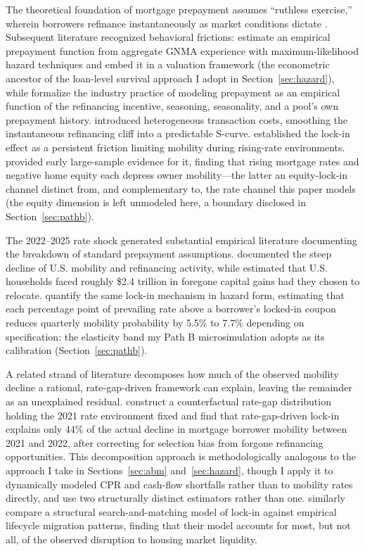 \documentclass[12pt]{article}
\begin{document}
The theoretical foundation of mortgage prepayment assumes ``ruthless exercise,'' wherein borrowers refinance instantaneously as market conditions dictate \citep{dunn1981}. Subsequent literature recognized behavioral frictions: \citet{schwartz1989} estimate an empirical prepayment function from aggregate GNMA experience with maximum-likelihood hazard techniques and embed it in a valuation framework (the econometric ancestor of the loan-level survival approach I adopt in Section~\ref{sec:hazard}), while \citet{richard1989} formalize the industry practice of modeling prepayment as an empirical function of the refinancing incentive, seasoning, seasonality, and a pool's own prepayment history. \citet{stanton1995} introduced heterogeneous transaction costs, smoothing the instantaneous refinancing cliff into a predictable S-curve. \citet{quigley1987,quigley2002} established the lock-in effect as a persistent friction limiting mobility during rising-rate environments. \citet{ferreira2010} provided early large-sample evidence for it, finding that rising mortgage rates and negative home equity each depress owner mobility---the latter an equity-lock-in channel distinct from, and complementary to, the rate channel this paper models (the equity dimension is left unmodeled here, a boundary disclosed in Section~\ref{sec:pathb}).

The 2022--2025 rate shock generated substantial empirical literature documenting the breakdown of standard prepayment assumptions. \citet{fonseca2024} documented the steep decline of U.S. mobility and refinancing activity, while \citet{batzer2024} estimated that U.S. households faced roughly \$2.4 trillion in foregone capital gains had they chosen to relocate. \citet{liebersohn2024} quantify the same lock-in mechanism in hazard form, estimating that each percentage point of prevailing rate above a borrower's locked-in coupon reduces quarterly mobility probability by 5.5\% to 7.7\% depending on specification: the elasticity band my Path B microsimulation adopts as its calibration (Section~\ref{sec:pathb}).

A related strand of literature decomposes how much of the observed mobility decline a rational, rate-gap-driven framework can explain, leaving the remainder as an unexplained residual. \citet{aladangady2024} construct a counterfactual rate-gap distribution holding the 2021 rate environment fixed and find that rate-gap-driven lock-in explains only 44\% of the actual decline in mortgage borrower mobility between 2021 and 2022, after correcting for selection bias from forgone refinancing opportunities. This decomposition approach is methodologically analogous to the approach I take in Sections~\ref{sec:abm} and~\ref{sec:hazard}, though I apply it to dynamically modeled CPR and cash-flow shortfalls rather than to mobility rates directly, and use two structurally distinct estimators rather than one. \citet{gerardi2024} similarly compare a structural search-and-matching model of lock-in against empirical lifecycle migration patterns, finding that their model accounts for most, but not all, of the observed disruption to housing market liquidity.
\end{document}

